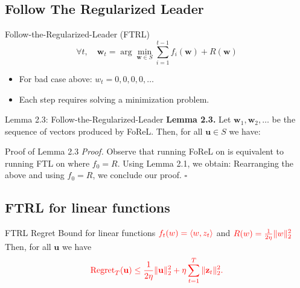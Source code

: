 \documentclass[handout]{beamer}
\begin{document}
\begin{small}
\section{Follow The Regularized Leader}
\begin{frame}{Follow-the-Regularized-Leader (FTRL)}
        \begin{equation*}
            \forall t, \quad \mathbf{w}_t = \arg\min_{\mathbf{w} \in S} \sum_{i=1}^{t-1} f_i(\mathbf{w}) + R(\mathbf{w})
        \end{equation*}
\begin{itemize}
  \item For bad case above: $w_t=0,0,0,0,\ldots$
  \item Each step requires solving a minimization problem.
    \end{itemize}
\end{frame}


\begin{frame}{Lemma 2.3: Follow-the-Regularized-Leader}
    \textbf{Lemma 2.3.} Let $\mathbf{w}_1, \mathbf{w}_2, \dots$ be the sequence of vectors produced by FoReL. Then, for all $\mathbf{u} \in S$ we have:
\end{frame}


\begin{frame}{Proof of Lemma 2.3}
    \textit{Proof.} Observe that running FoReL on  is equivalent to running FTL on  where $f_0 = R$. Using Lemma 2.1, we obtain:
    Rearranging the above and using $f_0 = R$, we conclude our proof. \hfill $\square$
  \end{frame}

  \subsection{FTRL for linear functions}
  \begin{frame}{FTRL Regret Bound for linear functions}
     $\textcolor{red}{f_t(w) = \langle w,z_t\rangle}$ and $\textcolor{red}{R(w) = \frac{1}{2\eta}\|w\|_2^2}$\\
     
    Then, for all \(\mathbf{u}\) we have
    \begin{equation*}
        \textcolor{red}{\text{Regret}_T(\mathbf{u}) \leq \frac{1}{2\eta} \|\mathbf{u}\|_2^2 + \eta \sum_{t=1}^{T} \|\mathbf{z}_t\|_2^2.}
    \end{equation*}
\end{frame}


\end{small}
\end{document}
